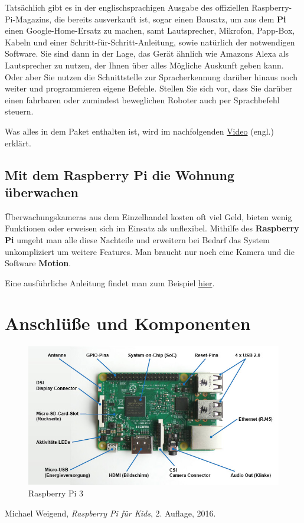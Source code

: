 \documentclass[12pt,a4paper]{article}
\newcommand{\rp}{\textbf{Raspberry Pi}\xspace}
\begin{document}
Tatsächlich gibt es in der englischsprachigen Ausgabe des offiziellen Raspberry-Pi-Magazins, die bereits ausverkauft ist, sogar einen Bausatz, um aus dem \textbf{Pi} einen Google-Home-Ersatz zu machen, samt Lautsprecher, Mikrofon, Papp-Box, Kabeln und einer Schritt-für-Schritt-Anleitung, sowie natürlich der notwendigen Software. Sie sind dann in der Lage, das Gerät ähnlich wie Amazons Alexa als Lautsprecher zu nutzen, der Ihnen über alles Mögliche Auskunft geben kann. Oder aber Sie nutzen die Schnittstelle zur Spracherkennung darüber hinaus noch weiter und programmieren eigene Befehle. Stellen Sie sich vor, dass Sie darüber einen fahrbaren oder zumindest beweglichen Roboter auch per Sprachbefehl steuern.

Was alles in dem Paket enthalten ist, wird im nachfolgenden \href{https://www.youtube.com/watch?v=7WtSdWSv7uo}{Video} (engl.) erklärt.

\subsection{Mit dem \rp die Wohnung überwachen}

Überwachungskameras aus dem Einzelhandel kosten oft viel Geld, bieten wenig Funktionen oder erweisen sich im Einsatz als unflexibel. Mithilfe des \rp umgeht man alle diese Nachteile und erweitern bei Bedarf das System unkompliziert um weitere Features. Man braucht nur noch eine Kamera und die Software \textbf{Motion}.

Eine ausführliche Anleitung findet man zum Beispiel \href{https://www.pcwelt.de/1925151/}{hier}.

\clearpage
\appendix
\makeatletter
\def\@seccntformat#1{Anhang~\csname the#1\endcsname:\quad}
\makeatother

\section{Anschlüße und Komponenten}
\label{apx:comp}

\begin{figure}[h]
\centering
\includegraphics[scale=0.7]{raspberry_loesung}
\caption{Raspberry Pi 3}
\label{fig:rp_ls}
\end{figure}

\begin{thebibliography}{1}
 Michael Weigend, {\em Raspberry Pi für Kids}, 2. Auflage, 2016.
\end{thebibliography}
\end{document}
